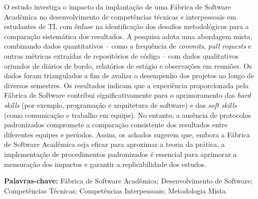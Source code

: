 \documentclass[
	12pt,           %
	openright,      %
	oneside,        %
	a4paper,        %
	brazil          %
]{abntex2}
\begin{document}
\frenchspacing
\imprimircapa
\imprimirfolhaderosto


\begin{resumo}
	O estudo investiga o impacto da implantação de uma Fábrica de Software Acadêmica no desenvolvimento de competências técnicas e interpessoais em estudantes de TI, com ênfase na identificação dos desafios metodológicos para a comparação sistemática dos resultados. A pesquisa adota uma abordagem mista, combinando dados quantitativos – como a frequência de \emph{commits}, \emph{pull requests} e outras métricas extraídas de repositórios de código – com dados qualitativos oriundos de diários de bordo, relatórios de estágio e observações em reuniões. Os dados foram triangulados a fim de avaliar o desempenho dos projetos ao longo de diversos semestres. Os resultados indicam que a experiência proporcionada pela Fábrica de Software contribui significativamente para o aprimoramento das \emph{hard skills} (por exemplo, programação e arquitetura de software) e das \emph{soft skills} (como comunicação e trabalho em equipe). No entanto, a ausência de protocolos padronizados compromete a comparação consistente dos resultados entre diferentes equipes e períodos. Assim, os achados sugerem que, embora a Fábrica de Software Acadêmica seja eficaz para aproximar a teoria da prática, a implementação de procedimentos padronizados é essencial para aprimorar a mensuração dos impactos e garantir a replicabilidade dos estudos.
	
	\textbf{Palavras-chave:} Fábrica de Software Acadêmica; Desenvolvimento de Software; Competências Técnicas; Competências Interpessoais; Metodologia Mista.
\end{resumo}
\end{document}
